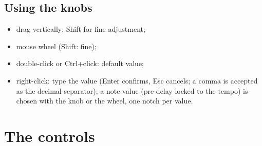 \documentclass[a4paper,11pt]{article}
\begin{document}
\subsection{Using the knobs}
\begin{itemize}
\item drag vertically; \textsf{Shift} for fine adjustment;
\item mouse wheel (\textsf{Shift}: fine);
\item double-click or \textsf{Ctrl}+click: default value;
\item right-click: type the value (\textsf{Enter} confirms, \textsf{Esc} cancels; a comma is
  accepted as the decimal separator); a note value (pre-delay locked to the tempo) is chosen
  with the knob or the wheel, one notch per value.
\end{itemize}

\section{The controls}\label{sec:controls}
\end{document}
